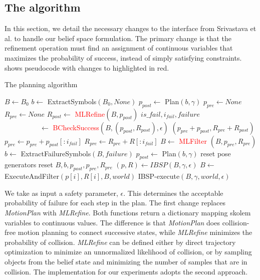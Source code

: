\subsection{The \ibsp{} algorithm}
\label{sec-ibsp}
In this section, we detail the necessary changes to the interface from
Srivastava et al. to handle our belief space formulation. The primary
change is that the refinement operation must find an assignment of
continuous variables that maximizes the probability of success,
instead of simply satisfying constraints.  shows
pseudocode with changes to  highlighted in red.

\begin{algorithm}
 \caption{The \ibsp{} planning algorithm} \label{alg-ibsp}
 \begin{algorithmic}[1]
  \State $B \leftarrow B_0$
  \State $b \leftarrow $ ExtractSymbols$(B_0, None)$
  \State $p_{post} \leftarrow $ Plan$(b, \gamma)$
  \State $p_{pre} \leftarrow None$
  \State $R_{pre} \leftarrow None$
     \State $R_{post} \leftarrow $ \textcolor{red}{MLRefine}$(B, p_{post})$
     \State $is\_fail,i_{fail}, failure$\\\ \ \ \ \ \ \ \ \ \ $\leftarrow $ \textcolor{red}{BCheckSuccess}$(B, (p_{post}, R_{post}), \epsilon)$
         \State \Return $(p_{pre} + p_{post}, R_{pre} + R_{post})$
     \EndIf
     \State $p_{pre} \leftarrow p_{pre} + p_{post}[:i_{fail}]$
     \State $R_{pre} \leftarrow R_{pre} + R[:i_{fail}]$
     \State $B \leftarrow $ \textcolor{red}{MLFilter} $(B, p_{pre}, R_{pre})$
     \State $b\leftarrow $ ExtractFailureSymbols$(B, failure)$
     \State $p_{post} \leftarrow $ Plan$(b, \gamma)$     
        \State reset pose generators
        \State reset $B, b, p_{post}, p_{pre}, R_{pre}$
     \EndIf
  \EndWhile
  \EndProcedure
    \State $(p, R) \leftarrow IBSP(B, \gamma, \epsilon)$
      \State $B \leftarrow$ ExecuteAndFilter$(p[i], R[i], B, world)$
        \State \Return IBSP-execute$(B, \gamma, world, \epsilon)$
      \EndIf
    \EndFor
  \EndProcedure
 \end{algorithmic}
\end{algorithm}

We take as input a safety parameter, $\epsilon$. This determines the
acceptable probability of failure for each step in the plan. The first
change replaces \emph{MotionPlan} with \emph{MLRefine}. Both
functions return a dictionary mapping skolem variables to continuous
values. The difference is that \emph{MotionPlan} does collision-free
motion planning to connect successive states, while \emph{MLRefine}
minimizes the probability of collision. \emph{MLRefine} can be defined
either by direct trajectory optimization to minimize an unnormalized
likelihood of collision, or by sampling objects from the belief state
and minimizing the number of samples that are in collision. The
implementation for our experiments adopts the second approach.

